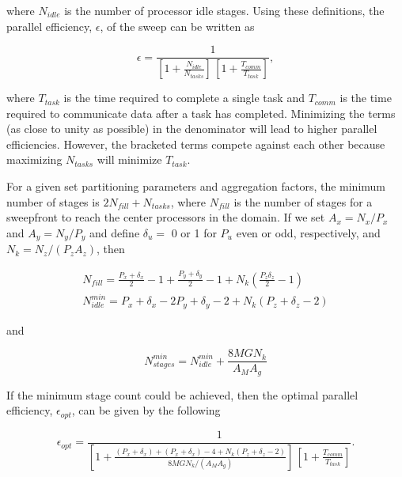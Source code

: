 \noindent where $N_{idle}$ is the number of processor idle stages. Using these definitions, the parallel efficiency, $\epsilon$, of the sweep can be written as

\begin{equation}
\label{sec::Sn_Solution_Spatial_paralleleff}
\epsilon = \frac{1}{\left[ 1+\frac{N_{idle}}{N_{tasks}} \right] \, \left[ 1+\frac{T_{comm}}{T_{task}} \right]} ,
\end{equation}

\noindent where $T_{task}$ is the time required to complete a single task and $T_{comm}$ is the time required to communicate data after a task has completed. Minimizing the terms (as close to unity as possible) in the denominator will lead to higher parallel efficiencies. However, the bracketed terms compete against each other because maximizing $N_{tasks}$ will minimize $T_{task}$. 

For a given set partitioning parameters and aggregation factors, the minimum number of stages is $2 N_{fill} + N_{tasks}$, where $N_{fill}$ is the number of stages for a sweepfront to reach the center processors in the domain. If we set $A_x = N_x / P_x$ and $A_y = N_y / P_y$ and define $\delta_u =$ 0 or 1 for $P_u$ even or odd, respectively, and $N_k=N_z / (P_z A_z)$, then

\begin{equation}
\label{sec::Sn_Solution_Spatial_Nfill_Nidle}
\begin{aligned}
N_{fill} = \frac{P_x + \delta_x}{2} - 1 +  \frac{P_y + \delta_y}{2} - 1 + N_k \left( \frac{P_z \delta_z}{2} -1 \right) \\
N_{idle}^{min} = P_x + \delta_x - 2  P_y + \delta_y - 2 + N_k ( P_z + \delta_z - 2)
\end{aligned}
\end{equation}

\noindent and

\begin{equation}
\label{sec::Sn_Solution_Spatial_Nmin}
N_{stages}^{min} = N_{idle}^{min} + \frac{8 M G N_k}{A_M A_g}
\end{equation}

\noindent If the minimum stage count could be achieved, then the optimal parallel efficiency, $\epsilon_{opt}$, can be given by the following

\begin{equation}
\label{sec::Sn_Solution_Spatial_epopt}
\epsilon_{opt} = \frac{1}{\left[ 1+\frac{(P_x + \delta_x) + (P_x + \delta_x) - 4 + N_k ( P_z + \delta_z - 2)}{{8 M G N_k} / {(A_M A_g)}} \right] \, \left[ 1+\frac{T_{comm}}{T_{task}} \right]} .
\end{equation}



